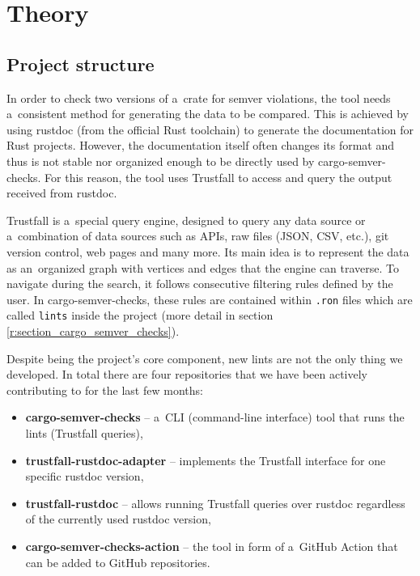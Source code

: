 \documentclass[licencjacka,en]{pracamgr}
\begin{document}

\chapter{Theory}\label{r:chapter_theory}

\section{Project structure}\label{r:section_project_structure}

In order to check two versions of a~crate for semver violations, the tool needs a~consistent method
for generating the data to be compared. This is achieved by using rustdoc (from the official
Rust toolchain) to generate the documentation for Rust projects. However, the documentation itself
often changes its format and thus is not stable nor organized enough to be directly used by
cargo-semver-checks. For this reason, the tool uses Trustfall to access and query the output
received from rustdoc.

Trustfall is a~special query engine, designed to query any data source or a~combination of data
sources such as APIs, raw files (JSON, CSV, etc.), git version control, web pages and many more.
Its main idea is to represent the data as an~organized graph with vertices and edges that the
engine can traverse. To navigate during the search, it follows consecutive filtering rules defined
by the user. In cargo-semver-checks, these rules are contained within \texttt{.ron} files which
are called \texttt{lints} inside the project (more detail in section
\ref{r:section_cargo_semver_checks}).

Despite being the project's core component, new lints are not the only thing we developed. In total
there are four repositories that we have been actively contributing to for the last few months:
\begin{itemize}
	\item \textbf{cargo-semver-checks} -- a~CLI (command-line interface) tool that runs the lints
		(Trustfall queries),
	\item \textbf{trustfall-rustdoc-adapter} -- implements the Trustfall interface for one specific
		rustdoc version,
	\item \textbf{trustfall-rustdoc} -- allows running Trustfall queries over rustdoc regardless of
		the currently used rustdoc version,
	\item \textbf{cargo-semver-checks-action} -- the tool in form of a~GitHub Action that can
	    be added to GitHub repositories.
\end{itemize}
\end{document}
